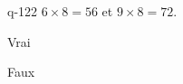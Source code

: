 \begin{truefalse}{q-122}
$6\times 8 = 56$ et $9\times 8 = 72$.
\item Vrai
\item* Faux
\end{truefalse}

